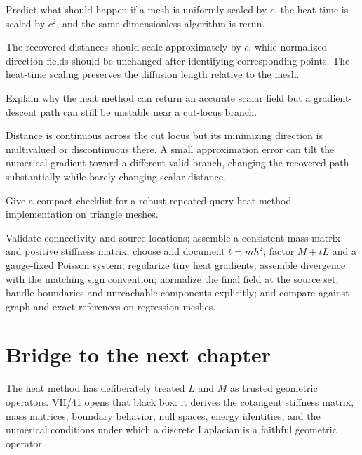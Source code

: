 \begin{problem}\label{prob:vii40-ch03}
Predict what should happen if a mesh is uniformly scaled by \(c\), the heat time is scaled by \(c^2\), and the same dimensionless algorithm is rerun.
\end{problem}

\begin{solution}
The recovered distances should scale approximately by \(c\), while normalized direction fields should be unchanged after identifying corresponding points.  The heat-time scaling preserves the diffusion length relative to the mesh.
\end{solution}

\begin{problem}\label{prob:vii40-ch04}
Explain why the heat method can return an accurate scalar field but a gradient-descent path can still be unstable near a cut-locus branch.
\end{problem}

\begin{solution}
Distance is continuous across the cut locus but its minimizing direction is multivalued or discontinuous there.  A small approximation error can tilt the numerical gradient toward a different valid branch, changing the recovered path substantially while barely changing scalar distance.
\end{solution}

\begin{problem}\label{prob:vii40-ch05}
Give a compact checklist for a robust repeated-query heat-method implementation on triangle meshes.
\end{problem}

\begin{solution}
Validate connectivity and source locations; assemble a consistent mass matrix and positive stiffness matrix; choose and document \(t=m h^2\); factor \(M+tL\) and a gauge-fixed Poisson system; regularize tiny heat gradients; assemble divergence with the matching sign convention; normalize the final field at the source set; handle boundaries and unreachable components explicitly; and compare against graph and exact references on regression meshes.
\end{solution}

\section{Bridge to the next chapter}

The heat method has deliberately treated \(L\) and \(M\) as trusted geometric
operators.  VII/41 opens that black box: it derives the cotangent stiffness
matrix, mass matrices, boundary behavior, null spaces, energy identities, and
the numerical conditions under which a discrete Laplacian is a faithful
geometric operator.

